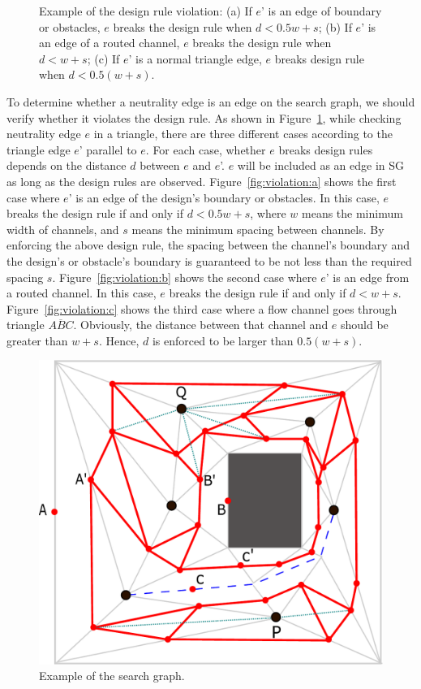 \documentclass[journal]{IEEEtran}
\begin{document}
\begin{figure}[htbp]
{\begin{minipage}[b]{0.8\columnwidth}
		\end{minipage}%
	}%
	\caption{Example of the design rule violation: (a) If $e$' is an edge of boundary or obstacles, $e$ breaks the design rule when $d < 0.5w+s$; (b) If $e$' is an edge of a routed channel, $e$ breaks the design rule when $d < w+s$; (c) If $e$' is a normal triangle edge, $e$ breaks design rule when $d < 0.5(w+s)$. }
	\label{fig:violation}
\end{figure}


To determine whether a neutrality edge is an edge on the search graph, 
we should verify whether it violates the design rule. 
As shown in Figure~\ref{fig:violation}, while checking neutrality edge $e$ in a triangle, there are three different cases according to the triangle edge $e$' parallel to $e$. For each case, whether $e$ breaks design rules depends on the distance $d$ between $e$ and $e$'. $e$ will be included as an edge in SG as long as the design rules are observed. 
Figure~\ref{fig:violation:a} shows the first case where $e$' is an edge of the design's boundary or obstacles. In this case, $e$ breaks the design rule if and only if $d < 0.5w+s$, where $w$ means the minimum width of channels, and $s$ means the minimum spacing between channels. By enforcing the above design rule, the spacing between the channel's boundary and the design's or obstacle's boundary is guaranteed to be not less than the required spacing $s$. 
Figure~\ref{fig:violation:b} shows the second case where $e$' is an edge from a routed channel. In this case, $e$ breaks the design rule if and only if $d < w+s$. 
Figure~\ref{fig:violation:c} shows the third case where a flow channel goes through triangle $\overline{ABC}$. Obviously, the distance between that channel and $e$ should be greater than $w+s$. Hence, $d$ is enforced to be larger than $0.5(w+s)$. 

\begin{figure}[htbp]
\centering
\includegraphics[width=0.55\columnwidth, angle=0]{./Figs/DTGExampleF.pdf}
\vspace{-0.15cm}
\caption{Example of the search graph.}
\label{fig:DTGExampleF}
\end{figure}
\end{document}
